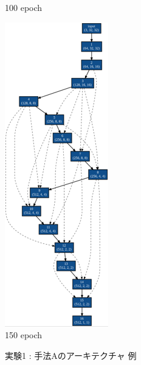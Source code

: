 \begin{figure}[tb]
\begin{minipage}{0.3\hsize}
\begin{center}
    100 epoch
 	\end{center}
 \end{minipage}
 \begin{minipage}{0.3\hsize}
 	\begin{center}
    \includegraphics[clip,scale=0.8]{./fig/04.exp/a150.png}\\
    150 epoch
 	\end{center}
 \end{minipage}
 \caption{実験1 : 手法Aのアーキテクチャ 例}
 \label{fig:exp1_a}
\end{figure}


